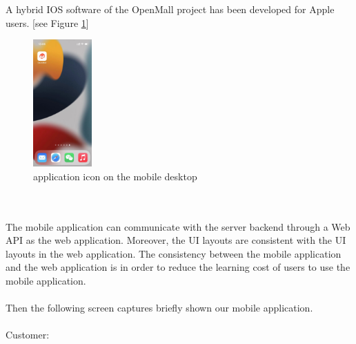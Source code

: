 \documentclass{article}
\begin{document}
A hybrid IOS software of the OpenMall project has been developed for Apple users. [see Figure \ref{fig:mobile desktop}] 
\begin{figure}[!htp]
    \centering
    \includegraphics[width=0.2\textwidth]{desktop.jpg}
    \caption{\label{fig:mobile desktop} application icon on the mobile desktop }
\end{figure}
\\\\
The mobile application can communicate with the server backend through a Web API as the web application. Moreover, the UI layouts are consistent with the UI layouts in the web application. The consistency between the mobile application and the web application is in order to reduce the learning cost of users to use the mobile application. 	
\\\\
Then the following screen captures briefly shown our mobile application. 	
\\\\
Customer:
\end{document}
